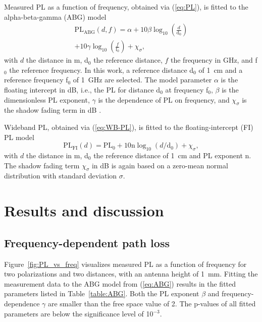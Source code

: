 \documentclass[manuscript]{rsl}
\begin{document}
Measured PL as a function of frequency, obtained via (\ref{eq:PL}), is fitted to the alpha-beta-gamma (ABG) model
\begin{multline}
  \text{PL}_{\text{ABG}}(d,f) = \alpha + 10 \beta \log_{10}\left(\frac{d}{\text{d}_0}\right) \\ + 10 \gamma \log_{10}\left(\frac{f}{ \text{f}_0}\right) + \chi_{\sigma},
  \label{eq:ABG}
\end{multline}
with $d$ the distance in m, d$_0$ the reference distance, $f$ the frequency in GHz, and f$_0$ the reference frequency.  
In this work, a reference distance d$_0$ of 1~cm and a reference frequency f$_0$ of 1~GHz are selected.
The model parameter $\alpha$ is the floating intercept in dB, i.e., the PL for distance d$_0$ at frequency f$_0$, $\beta$ is the dimensionless PL exponent, $\gamma$ is the dependence of PL on frequency, and $\chi_{\sigma}$ is the shadow fading term in dB \cite{Salous2020}. 

Wideband PL, obtained via (\ref{eq:WB-PL}), is fitted to the floating-intercept (FI) PL model 
\begin{equation}
  \text{PL}_{\text{FI}}(d) = \text{PL}_0 + 10 \text{n} \log_{10} (d/\text{d}_0) + \chi_\sigma, 
  \label{eq:FI}
\end{equation}
with $d$ the distance in m, d$_0$ the reference distance of 1~cm and PL exponent n. 
The shadow fading term $\chi_\sigma$ in dB is again based on a zero-mean normal distribution with standard deviation $\sigma$. 

\section{Results and discussion\label{sect:results}}

\subsection{Frequency-dependent path loss}

Figure~\ref{fig:PL_vs_freq} visualizes measured PL as a function of frequency for two polarizations and two distances, with an antenna height of 1~mm.
Fitting the measurement data to the ABG model from (\ref{eq:ABG}) results in the fitted parameters listed in Table~\ref{table:ABG}. 
Both the PL exponent $\beta$ and frequency-dependence $\gamma$ are smaller than the free space value of 2. 
The p-values of all fitted parameters are below the significance level of 10$^{-3}$. 
\end{document}
